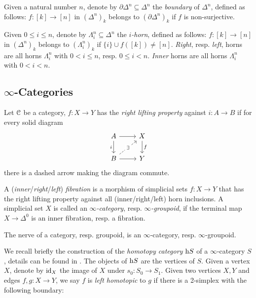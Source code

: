 \documentclass[10pt]{amsart}
\numberwithin{equation}{section}
\begin{document}
\begin{example}
  Given a natural number $n$, denote by $\partial\Delta^n\subseteq\Delta^n$ the \emph{boundary} of $\Delta^n$, defined as follows: $f:[k]\to[n]$ in $(\Delta^n)_k$ belongs to $(\partial\Delta^n)_k$ if $f$ is non-surjective. 
\end{example}
\begin{example}
  Given $0\leq i\leq n$, denote by $\Lambda^n_i\subseteq\Delta^n$ the \emph{$i$-horn}, defined as follows: $f:[k]\to[n]$ in $(\Delta^n)_k$ belongs to $(\Lambda^n_i)_k$ if $\{i\}\cup f([k])\neq[n]$. \emph{Right}, resp. \emph{left}, horns are all horns $\Lambda^n_i$ with $0<i\leq n$, resp. $0\leq i<n$. \emph{Inner} horns are all horns $\Lambda^n_i$ with $0<i<n$.  
\end{example}

\subsection{\texorpdfstring{$\infty$}{oo}-Categories} 
\begin{definition}
  Let $\mathcal{C}$ be a category, $f:X\to Y$ has the \emph{right lifting property} against $i:A\to B$ if for every solid diagram \begin{equation}
    \begin{tikzcd}
      A \arrow[d,"i"']\arrow[r] & X \arrow[d,"f"] \\
      B \arrow[ru,dashed,"\exists" description]\arrow[r] & Y
    \end{tikzcd}
  \end{equation}there is a dashed arrow making the diagram commute. 
\end{definition}
\begin{definition}
  A (\emph{inner}/\emph{right}/\emph{left}) \emph{fibration} is a morphism of simplicial sets $f:X\to Y$ that has the right lifting property against all (inner/right/left) horn inclusions. A simplicial set $X$ is called an \emph{$\infty$-category}, resp. \emph{$\infty$-groupoid}, if the terminal map $X\to\Delta^0$ is an inner fibration, resp. a fibration. 
\end{definition}
\begin{example}
  The nerve of a category, resp. groupoid, is an $\infty$-category, resp. $\infty$-groupoid. 
\end{example}
We recall briefly the construction of the \emph{homotopy category} $\mathrm{h} S$ of a $\infty$-category $S$, details can be found in \cite{lurie2009htt,kerodon2026homcat}. The objects of $\mathrm{h} S$ are the vertices of $S$. Given a vertex $X$, denote by $\mathrm{id}_X$ the image of $X$ under $s_0:S_0\to S_1$. Given two vertices $X,Y$ and edges $f,g:X\to Y$, we say $f$ is \emph{left homotopic} to $g$ if there is a 2-simplex with the following boundary: 
\end{document}
